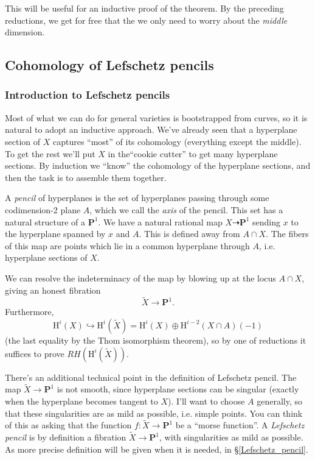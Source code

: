 \documentclass[letterpaper,11pt]{article}
\newcommand{\wt}[1]{\widetilde{#1}}
\newcommand{\PS}{\mathbf{P}}
\newcommand{\mrm}[1]{\mathrm{#1}}
\begin{document}
This will be useful for an inductive proof of the theorem. By the preceding reductions, we get for free that the we only need to worry about the \emph{middle} dimension. 


\subsection{Cohomology of Lefschetz pencils}
\subsubsection{Introduction to Lefschetz pencils}
Most of what we can do for general varieties is bootstrapped from curves, so it is natural to adopt an inductive approach. We've already seen that a hyperplane section of $X$ captures ``most'' of its cohomology (everything except the middle). To get the rest we'll put $X$ in the``cookie cutter'' to get many hyperplane sections. By induction we ``know'' the cohomology of the hyperplane sections, and then the task is to assemble them together. 

A \emph{pencil} of hyperplanes is the set of hyperplanes passing through some codimension-2 plane $A$, which we call the \emph{axis} of the pencil. This set has a natural structure of a $\PS^1$. We have a natural rational map $X \dashrightarrow \PS^1$ sending $x$ to the hyperplane spanned by $x$ and $A$. This is defined away from $A \cap X$. The fibers of this map are points which lie in a common hyperplane through $A$, i.e. hyperplane sections of $X$. 

We can resolve the indeterminacy of the map by blowing up at the locus $A \cap X$, giving an honest fibration 
\[
\wt{X} \rightarrow \PS^1.
\]
Furthermore, 
\[
\mrm{H}^i(X) \hookrightarrow \mrm{H}^i(\wt{X}) = \mrm{H}^i(X) \oplus \mrm{H}^{i-2}(X \cap A)(-1)
\]
(the last equality by the Thom isomorphism theorem), so by one of reductions it suffices to prove $RH(\mrm{H}^i(\wt{X}))$. 

There's an additional technical point in the definition of Lefschetz pencil. The map $\wt{X} \rightarrow \PS^1$ is not smooth, since hyperplane sections can be singular (exactly when the hyperplane becomes tangent to $X$). I'll want to choose $A$ generally, so that these singularities are as mild as possible, i.e. simple points. You can think of this as asking that the function $f \colon \wt{X} \rightarrow \PS^1$ be a ``morse function''. A \emph{Lefschetz pencil} is by definition a fibration  $\wt{X} \rightarrow \PS^1$, with singularities as mild as possible. As more precise definition will be given when it is needed, in \S \ref{Lefschetz_pencil}. 
\end{document}

